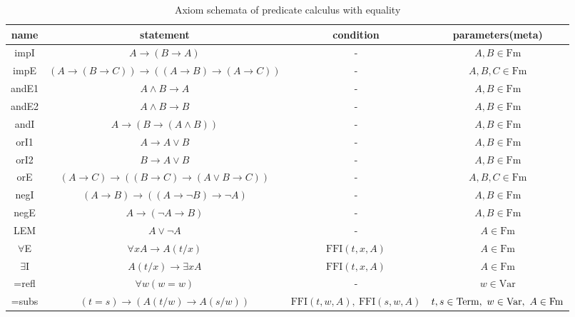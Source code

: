 \documentclass[10pt,a4paper]{article}
\begin{document}
\begin{table}[H]
\centering
\setlength{\tabcolsep}{4.5pt}
\caption{Axiom schemata of predicate calculus with equality}
\label{tab:axiompltab}
\begin{tabular}{|c|c|c|c|}
\hline
name & statement & condition & parameters(meta)\\ \hline
\hline
impI & $A \to (B \to A)$ & - & $A,B \in \textrm{Fm}$\\ %
impE & $(A \to (B \to C))\to((A\to B)\to(A\to C))$ & -& $A,B,C \in \textrm{Fm}$\\ \hline
\hline
andE1 & $A \land B \to A$& -& $A,B \in \textrm{Fm}$\\ %
andE2 & $A \land B \to B$& -& $A,B \in \textrm{Fm}$\\ %
andI & $A\to(B\to (A \land B))$& -& $A,B \in \textrm{Fm}$\\ \hline
\hline
orI1 & $A \to  A \lor B$& -& $A,B \in \textrm{Fm}$\\ %
orI2 & $B \to  A \lor B$& -& $A,B \in \textrm{Fm}$\\ %
orE & $(A \to  C)\to ((B \to  C) \to  (A \lor B \to  C))$& -& $A,B,C \in \textrm{Fm}$\\ \hline
\hline
negI & $(A \to  B) \to  ((A \to  \neg B) \to  \neg A)$& -& $A,B \in \textrm{Fm}$\\ %
negE & $A \to  (\neg A \to  B)$& -& $A,B \in \textrm{Fm}$\\ \hline
\hline
LEM & $A \lor \neg A$& -& $A \in \textrm{Fm}$\\ \hline
\hline
$\forall$E & $\forall xA\to A(t/x)$ & $\textrm{FFI}(t,x,A)$& $A \in \textrm{Fm}$\\ %
$\exists$I & $A(t/x)\to \exists x A$ & $\textrm{FFI}(t,x,A)$& $A \in \textrm{Fm}$\\ \hline
\hline
=refl&$\forall w (w=w)$&-& $w \in \textrm{Var}$\\
=subs&$(t=s)\to ( A(t/w)\to A(s/w)) $&$\textrm{FFI}(t,w,A),\ \textrm{FFI}(s,w,A)$& $t,s \in {\textrm{Term}},\ w \in {\textrm{Var}},\ A \in {\textrm{Fm}}$\\\hline
\end{tabular}
\end{table}
\end{document}
